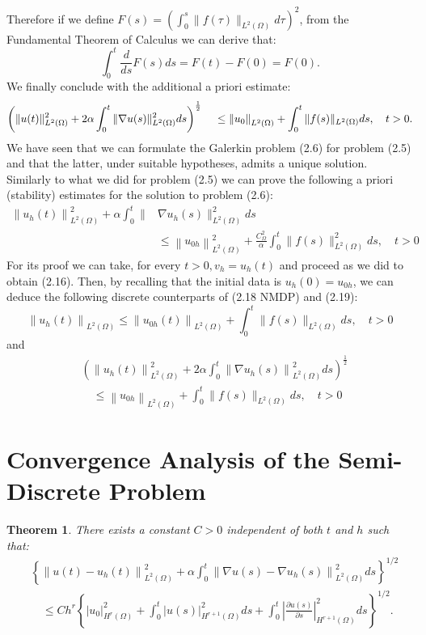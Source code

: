 \documentclass[11pt]{book}
\newtheorem{theorem}{Theorem}
\begin{document}
Therefore if we define $F(s) = \left(\int_{0}^{s}\|f(\tau)\|_{L^{2}(\Omega)} d \tau\right)^{2} $, from the Fundamental Theorem of Calculus we can derive that:
$$\int_0^t\frac{d}{ds}F(s) ds = F(t)-F(0) = F(0).$$
We finally conclude with the additional a priori estimate:
\begin{equation}
 \left(\|u(t)\|_{L^{2}(\Omega)}^{2}+2 \alpha \int_{0}^{t}\|\nabla u(s)\|_{L^{2}(\Omega)}^{2} d s\right)^{\frac{1}{2}} \\
 \quad \leq\left\|u_{0}\right\|_{L^{2}(\Omega)}+\int_{0}^{t}\|f(s)\|_{L^{2}(\Omega)} d s, \quad t>0 . \\ \\
\end{equation}
We have seen that we can formulate the Galerkin problem (2.6) for problem (2.5) and that the latter, under suitable hypotheses, admits a unique solution. Similarly to what we did for problem (2.5) we can prove the following a priori (stability) estimates for the solution to problem (2.6):
$$
\begin{aligned}
\left\|u_{h}(t)\right\|_{L^{2}(\Omega)}^{2}+\alpha \int_{0}^{t} \| & \nabla u_{h}(s) \|_{L^{2}(\Omega)}^{2} d s \\
& \leq\left\|u_{0 h}\right\|_{L^{2}(\Omega)}^{2}+\frac{C_{\Omega}^{2}}{\alpha} \int_{0}^{t}\|f(s)\|_{L^{2}(\Omega)}^{2} d s, \quad t>0
\end{aligned}
$$
For its proof we can take, for every $t>0, v_{h}=u_{h}(t)$ and proceed as we did to obtain (2.16). Then, by recalling that the initial data is $u_{h}(0)=u_{0 h}$, we can deduce the following discrete counterparts of (2.18 NMDP) and (2.19):
$$
\left\|u_{h}(t)\right\|_{L^{2}(\Omega)} \leq\left\|u_{0 h}(t)\right\|_{L^{2}(\Omega)}+\int_{0}^{t}\|f(s)\|_{L^{2}(\Omega)} d s, \quad t>0
$$
and
$$
\begin{aligned}
&\left(\left\|u_{h}(t)\right\|_{L^{2}(\Omega)}^{2}+2 \alpha \int_{0}^{t}\left\|\nabla u_{h}(s)\right\|_{L^{2}(\Omega)}^{2} d s\right)^{\frac{1}{2}} \\
& \quad \leq\left\|u_{0 h}\right\|_{L^{2}(\Omega)}+\int_{0}^{t}\|f(s)\|_{L^{2}(\Omega)} d s, \quad t>0
\end{aligned}
$$
\section*{Convergence Analysis of the Semi-Discrete Problem}
\begin{theorem}
There exists a constant $C>0$ independent of both $t$ and $h$ such that:
\begin{align*}
    & \left\{\left\|u(t)-u_{h}(t)\right\|_{L^{2}(\Omega)}^{2}+\alpha \int_{0}^{t}\left\|\nabla u(s)-\nabla u_{h}(s)\right\|_{L^{2}(\Omega)}^{2} d s\right\}^{1 / 2} \\
& \quad \leq C h^{r}\left\{\left|u_{0}\right|_{H^{r}(\Omega)}^{2}+\int_{0}^{t}|u(s)|_{H^{r+1}(\Omega)}^{2} d s+\int_{0}^{t}\left|\frac{\partial u(s)}{\partial s}\right|_{H^{r+1}(\Omega)}^{2} d s\right\}^{1 / 2} .
\end{align*}
\end{theorem}
\end{document}
